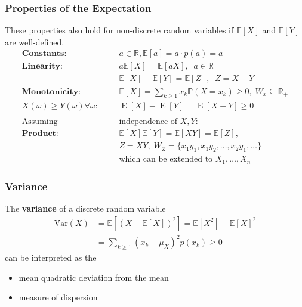 \subsubsection{Properties of the Expectation}
These properties also hold for non-discrete random variables if $\mathbb{E}[X]$ and $\mathbb{E}[Y]$ are well-defined.
\noindent\begin{align*}
    \textbf{Constants:}                   &  &  & a\in\mathbb{R},\mathbb{E}[a]=a\cdot p(a)=a                                          \\
    \textbf{Linearity:}                   &  &  & a\mathbb{E}[X]=\mathbb{E}[aX],\;\;a\in \mathbb{R}                                   \\
                                          &  &  & \mathbb{E}[X]+\mathbb{E}[Y]=\mathbb{E}[Z],\;\; Z=X+Y                                \\
    \textbf{Monotonicity:}                &  &  & \mathbb{E}[X]=\sum_{k\geq1}x_k\mathbb{P}(X=x_k)\geq0, \; W_x \subseteq \mathbb{R}_+ \\
    X(\omega)\geq Y(\omega)\forall\omega: &  &  & \operatorname{E}[X]-\operatorname{E}[Y]=\operatorname{E}[X-Y]\geq0                  \\\\
    \text{Assuming}                       &  &  & \text{independence of } X,Y:                                                        \\
    \textbf{Product:}                     &  &  & \mathbb{E}[X]\mathbb{E}[Y] = \mathbb{E}[XY] = \mathbb{E}[Z],                        \\
                                          &  &  & Z=XY, \;W_Z =\{x_1y_1,x_1y_2,\ldots,x_2y_1,\ldots\}                                 \\
                                          &  &  & \text{which can be extended to }X_1,\ldots,X_n
\end{align*}

\subsubsection{Variance}
The \textbf{variance} of a discrete random variable
\noindent\begin{align*}
    \mathrm{Var}(X) & = \mathbb{E}[{(X-\mathbb{E}[X])}^2] = \mathbb{E}[X^2]-{\mathbb{E}[X]}^2 \\
                    & = \sum_{k\geq1}{(x_k-\mu_X)}^2p(x_k)\geq0
\end{align*}
can be interpreted as the
\begin{itemize}
    \item mean quadratic deviation from the mean
    \item measure of dispersion
\end{itemize}

